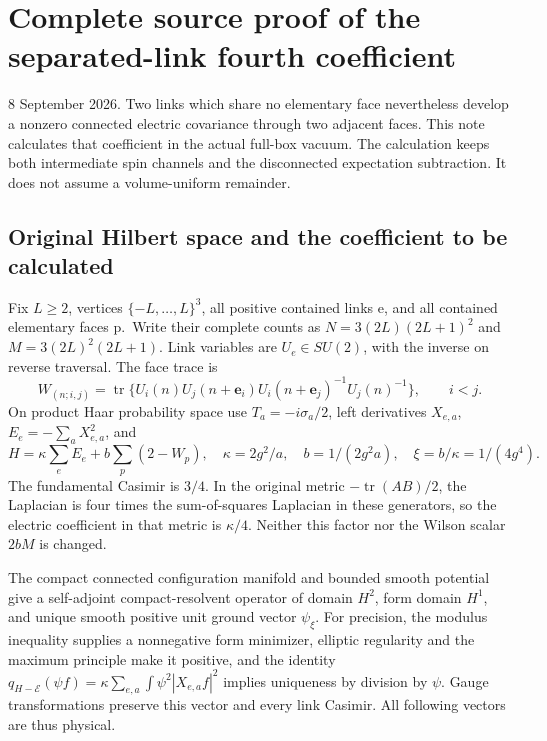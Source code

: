 \section{Complete source proof of the separated-link fourth coefficient}\label{app:xi4-source}\label{the-first-separated-link-connected-electric-covariance}

8 September 2026. Two links which share no elementary face nevertheless develop a nonzero connected electric covariance through two adjacent faces. This note calculates that coefficient in the actual full-box vacuum. The calculation keeps both intermediate spin channels and the disconnected expectation subtraction. It does not assume a volume-uniform remainder.

\subsection{Original Hilbert space and the coefficient to be calculated}\label{original-hilbert-space-and-the-coefficient-to-be-calculated}

Fix \(L\geq2\), vertices \(\{-L,\ldots,L\}^3\), all positive contained links e, and all contained elementary faces p.~Write their complete counts as \(N=3(2L)(2L+1)^2\) and \(M=3(2L)^2(2L+1)\). Link variables are \(U_e\in SU(2)\), with the inverse on reverse traversal. The face trace is \[
 W_{(n;i,j)}=\operatorname{tr}\{U_i(n)U_j(n+\mathbf e_i)
           U_i(n+\mathbf e_j)^{-1}U_j(n)^{-1}\},\qquad i<j.
\] On product Haar probability space use \(T_a=-i\sigma_a/2\), left derivatives \(X_{e,a}\), \(E_e=-\sum_aX_{e,a}^2\), and \[
 H=\kappa\sum_eE_e+b\sum_p(2-W_p),\quad
 \kappa=2g^2/a,\quad b=1/(2g^2a),\quad\xi=b/\kappa=1/(4g^4).
\tag{S1}
\] The fundamental Casimir is \(3/4\). In the original metric \(-\operatorname{tr}(AB)/2\), the Laplacian is four times the sum-of-squares Laplacian in these generators, so the electric coefficient in that metric is \(\kappa/4\). Neither this factor nor the Wilson scalar \(2bM\) is changed.

The compact connected configuration manifold and bounded smooth potential give a self-adjoint compact-resolvent operator of domain \(H^2\), form domain \(H^1\), and unique smooth positive unit ground vector \(\psi_\xi\). For precision, the modulus inequality supplies a nonnegative form minimizer, elliptic regularity and the maximum principle make it positive, and the identity \(q_{H-\mathcal E}(\psi f)=\kappa\sum_{e,a}\int\psi^2|X_{e,a}f|^2\) implies uniqueness by division by \(\psi\). Gauge transformations preserve this vector and every link Casimir. All following vectors are thus physical.

